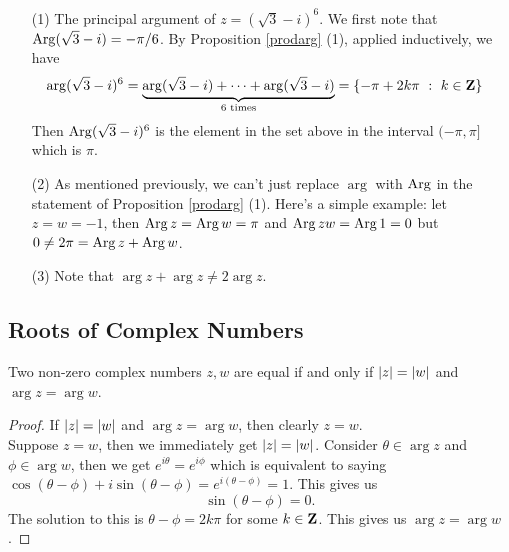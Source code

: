 \medskip

\begin{example}\hfill
\begin{itemize}
\item[(1)] The principal argument of $z = (\sqrt{3} - i)^6$. We first note that $\operatorname{Arg}(\sqrt{3} - i) = -\pi/6$. By Proposition \ref{prodarg} (1), applied inductively, we have
\begin{align*}
\arg (\sqrt{3} - i)^6 &= \underbrace{\arg(\sqrt{3} - i) + \cdots + \arg(\sqrt{3} - i)}_{\text{$6$ times}} = \left\{-\pi + 2k\pi\ :\ k \in \mathbf Z\right\}
\end{align*}
Then $\operatorname{Arg}(\sqrt{3} - i)^6$ is the element in the set above in the interval $(-\pi,\pi]$ which is $\pi$.
\item[(2)] As mentioned previously, we can't just replace $\arg$ with $\operatorname{Arg}$ in the statement of Proposition \ref{prodarg} (1). Here's a simple example: let $z = w = -1$, then $\operatorname{Arg} z = \operatorname{Arg} w = \pi$ and $\operatorname{Arg} zw = \operatorname{Arg} 1 = 0$ but $0 \neq 2\pi = \operatorname{Arg} z + \operatorname{Arg} w$.
\item[(3)] Note that $\arg z + \arg z \neq 2\arg z$.
\end{itemize}
\vspace*{-\baselineskip}
\end{example}

\bigskip

\subsection{Roots of Complex Numbers}

\begin{lemma}\label{polareq}
Two non-zero complex numbers $z,w$ are equal if and only if $\left\lvert z\right\rvert = \left\lvert w\right\rvert$ and $\arg z = \arg w$.
\end{lemma}
\begin{proof}
If $\left\lvert z\right\rvert = \left\lvert w\right\rvert$ and $\arg z = \arg w$, then clearly $z = w$.\\[0.5em]
Suppose $z = w$, then we immediately get $\left\lvert z\right\rvert = \left\lvert w\right\rvert$. Consider $\theta \in \arg z$ and $\phi \in \arg w$, then we get $e^{i\theta} = e^{i\phi}$ which is equivalent to saying $\cos(\theta - \phi) + i\sin(\theta - \phi) = e^{i(\theta - \phi)} = 1$. This gives us
\[\sin (\theta - \phi) = 0.\]
The solution to this is $\theta - \phi = 2k\pi$ for some $k\in \mathbf Z$. This gives us $\arg z = \arg w$.
\end{proof}

